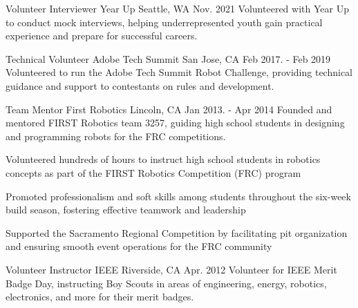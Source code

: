 

\begin{cventries}

  \cventry
    {Volunteer Interviewer} %
    {Year Up} %
    {Seattle, WA} %
    {Nov. 2021} %
    {Volunteered with Year Up to conduct mock interviews, helping underrepresented youth gain practical experience and prepare for successful careers.} %
    {}

  \cventry
    {Technical Volunteer} %
    {Adobe Tech Summit} %
    {San Jose, CA} %
    {Feb 2017. - Feb 2019} %
    {Volunteered to run the Adobe Tech Summit Robot Challenge, providing technical guidance and support to contestants on rules and development.} %
    {}

  \cventry
    {Team Mentor} %
    {First Robotics} %
    {Lincoln, CA} %
    {Jan 2013. - Apr 2014} %
    {Founded and mentored FIRST Robotics team 3257, guiding high school students in designing and programming robots for the FRC competitions.} %
    {
        \begin{cvitems} %
            \item {Volunteered hundreds of hours to instruct high school students in robotics concepts as part of the FIRST Robotics Competition (FRC) program}
            \item {Promoted professionalism and soft skills among students throughout the six-week build season, fostering effective teamwork and leadership}
            \item {Supported the Sacramento Regional Competition by facilitating pit organization and ensuring smooth event operations for the FRC community}
        \end{cvitems}
    }

  \cventry
    {Volunteer Instructor} %
    {IEEE} %
    {Riverside, CA} %
    {Apr. 2012} %
    {Volunteer for IEEE Merit Badge Day, instructing Boy Scouts in areas of engineering, energy, robotics, electronics, and more for their merit badges.} %
    {}

\end{cventries}
